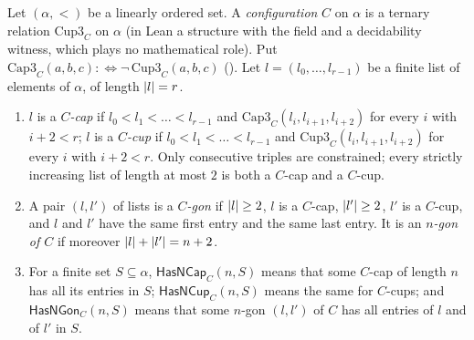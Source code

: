 \begin{definition}\label{mb:def:config}
Let $(\alpha,<)$ be a linearly ordered set. A \emph{configuration} $C$ on $\alpha$ is a ternary relation
$\mathrm{Cup3}_C$ on $\alpha$ (in Lean a structure with the field  and a decidability witness, which plays no
mathematical role). Put $\mathrm{Cap3}_C(a,b,c):\Leftrightarrow\neg\,\mathrm{Cup3}_C(a,b,c)$ ().
Let $l=(l_0,\dots,l_{r-1})$ be a finite list of elements of $\alpha$, of length $\lvert l\rvert=r$.
\begin{enumerate}[label=(\alph*)]
\item $l$ is a \emph{$C$-cap} if $l_0<l_1<\dots<l_{r-1}$ and $\mathrm{Cap3}_C(l_i,l_{i+1},l_{i+2})$ for every $i$ with
  $i+2<r$; $l$ is a \emph{$C$-cup} if $l_0<l_1<\dots<l_{r-1}$ and $\mathrm{Cup3}_C(l_i,l_{i+1},l_{i+2})$ for every $i$
  with $i+2<r$. Only consecutive triples are constrained; every strictly increasing list of length at most $2$ is both a
  $C$-cap and a $C$-cup.
\item A pair $(l,l')$ of lists is a \emph{$C$-gon} if $\lvert l\rvert\ge2$, $l$ is a $C$-cap, $\lvert l'\rvert\ge2$, $l'$ is a
  $C$-cup, and $l$ and $l'$ have the same first entry and the same last entry. It is an \emph{$n$-gon of $C$} if moreover
  $\lvert l\rvert+\lvert l'\rvert=n+2$.
\item For a finite set $S\subseteq\alpha$, $\mathsf{HasNCap}_C(n,S)$ means that some $C$-cap of length $n$ has all its
  entries in $S$; $\mathsf{HasNCup}_C(n,S)$ means the same for $C$-cups; and $\mathsf{HasNGon}_C(n,S)$ means that some
  $n$-gon $(l,l')$ of $C$ has all entries of $l$ and of $l'$ in $S$.
\end{enumerate}
\end{definition}

